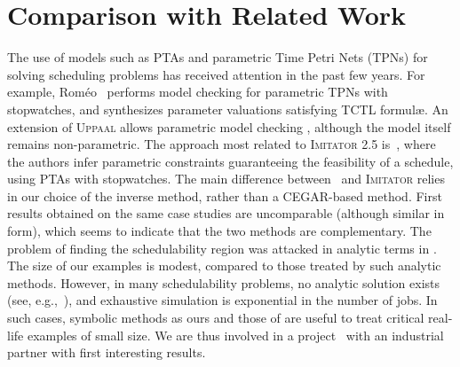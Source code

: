 \documentclass{llncs}
\newcommand{\hytech}{{\sc HyTech}}
\newcommand{\imitator}{\textsc{Imitator}}
\newcommand{\romeo}{Rom\'eo}
\newcommand{\trex}{\textsc{TReX}}
\newcommand{\uppaal}{\textsc{Uppaal}}
\newcommand{\commentaire}[1]{\textcolor{red}{\textbf{$\Leftarrow$  #1 $\Rightarrow$}}}
\begin{document}
\section{Comparison with Related Work}


The use of models such as PTAs and parametric Time Petri Nets (TPNs)
for solving scheduling problems has received attention in the past few years.
For example, \romeo{}~\cite{lrst09} performs 
model checking for parametric TPNs with stopwatches, and synthesizes parameter valuations satisfying TCTL formul\ae{}.
An extension of \uppaal{} allows parametric model checking \cite{BLR05formats}, although the model itself remains non-parametric.
%
%
The approach most related to \imitator{} 2.5 is~\cite{cpr08,LPPRC10}, where the authors infer parametric constraints guaranteeing the feasibility of a schedule, using PTAs with stopwatches.
The main difference between~\cite{cpr08,LPPRC10} and \imitator{} relies in our choice of the inverse method, rather than a CEGAR-based method.
First results obtained on the same case studies
are uncomparable (although similar in form), which seems to indicate
that the two methods are complementary.
The problem of finding the schedulability region was attacked in analytic terms
in \cite{bb04}. 
The size of our examples is modest, compared to those treated by such analytic methods.
However, in many schedulability problems,
no analytic solution exists (see, e.g.,~\cite{SGL97}), 
and exhaustive simulation is exponential
in the number of jobs. In such cases, symbolic methods as ours and those
of \cite{cpr08,LPPRC10}  are useful to treat
critical real-life examples of small size.
We are thus involved in a project~\cite{fl11} with an industrial partner 
with first interesting results.
\end{document}

